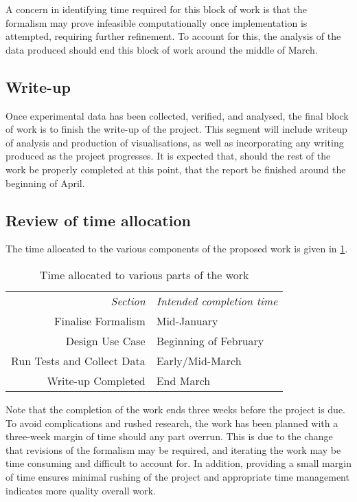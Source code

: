 A concern in identifying time required for this block of work is that the formalism may prove infeasible computationally once implementation is attempted, requiring further refinement. To account for this, the analysis of the data produced should end this block of work around the middle of March.\par

\subsection{Write-up}
Once experimental data has been collected, verified, and analysed, the final block of work is to finish the write-up of the project. This segment will include writeup of analysis and production of visualisations, as well as incorporating any writing produced as the project progresses. It is expected that, should the rest of the work be properly completed at this point, that the report be finished around the beginning of April.\par

\subsection{Review of time allocation}
The time allocated to the various components of the proposed work is given in \cref{table:time-allocation}.

\begin{table}\label{table:time-allocation}
\begin{center}
\begin{tabular}{r|l}
    \emph{Section} & \emph{Intended completion time}\\
    Finalise Formalism & Mid-January\\
    Design Use Case & Beginning of February\\
    Run Tests and Collect Data & Early/Mid-March\\
    Write-up Completed & End March\\
\end{tabular}\par
    \caption{Time allocated to various parts of the work}
\end{center}
\end{table}

Note that the completion of the work ends three weeks before the project is due. To avoid complications and rushed research, the work has been planned with a three-week margin of time should any part overrun. This is due to the change that revisions of the formalism may be required, and iterating the work may be time consuming and difficult to account for. In addition, providing a small margin of time ensures minimal rushing of the project and appropriate time management indicates more quality overall work.\par
